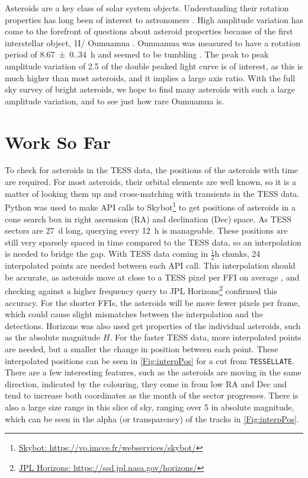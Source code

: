 \documentclass[12pt]{article}
\DeclareRobustCommand{\okina}{%
  \raisebox{\dimexpr\fontcharht\font`A-\height}{%
    \scalebox{0.8}{`}%
  }%
}
\newcommand{\omuamua}{\okina Oumuamua }
\begin{document}
Asteroids are a key class of solar system objects. 
Understanding their rotation properties has long been of interest to astronomers \citep[e.g.][]{Weidenschilling1981,Harris1994}. %
High amplitude variation has come to the forefront of questions about asteroid properties because of the first interstellar object, 1I/\omuamua \citep[see][for a review]{Bannister2019}. 
\omuamua was measured to have a rotation period of \qty{8.67(0.34)}{\hour} \citep{Belton2018} and seemed to be tumbling \citep[e.g.][]{Drahus2018,Fraser2018}. 
The peak to peak amplitude variation of \qty{2.5}{\mag} \citep{Meech2017} of the double peaked light curve is of interest, as this is much higher than most asteroids, and it implies a large axis ratio. 
With the full sky survey of bright asteroids, we hope to find many asteroids with such a large amplitude variation, and to see just how rare \omuamua is.  

\section{Work So Far}

To check for asteroids in the TESS data, the positions of the asteroids with time are required.
For most asteroids, their orbital elements are well known, so it is a matter of looking them up and cross-matching with transients in the TESS data.
Python was used to make API calls to {Skybot}\footnote{\href{https://vo.imcce.fr/webservices/skybot/}{Skybot: https://vo.imcce.fr/webservices/skybot/}} to get positions of asteroids in a cone search box in right ascension (RA) and  declination (Dec) space.
As TESS sectors are \qty{27}{\day} long, querying every \qty{12}{\hour} is manageable.
These positions are still very sparsely spaced in time compared to the TESS data, so an interpolation is needed to bridge the gap.
With TESS data coming in $\frac12\unit{\hour}$ chunks, 24 interpolated points are needed between each API call.
This interpolation should be accurate, as asteroids move at close to a TESS pixel per FFI on average \citep{Pal2018,Pal2020}, and checking against a higher frequency query to {JPL Horizons}\footnote{\href{https://ssd.jpl.nasa.gov/horizons/}{JPL Horizons: https://ssd.jpl.nasa.gov/horizons/}} confirmed this accuracy.
For the shorter FFIs, the asteroids will be move fewer pixels per frame, which could cause slight mismatches between the interpolation and the detections. 
Horizons was also used get properties of the individual asteroids, such as the absolute magnitude $H$. 
For the faster TESS data, more interpolated points are needed, but a smaller the change in position between each point.
These interpolated positions can be seen in \autoref{Fig:interpPos} for a cut from \texttt{TESSELLATE}. 
There are a few interesting features, such as the asteroids are moving in the same direction, indicated by the colouring, they come in from low RA and Dec and tend to increase both coordinates as the month of the sector progresses. 
There is also a large size range in this slice of sky, ranging over \qty{5}{\mag} in absolute magnitude, which can be seen in the alpha (or transparency) of the tracks in \autoref{Fig:interpPos}. 
\end{document}
